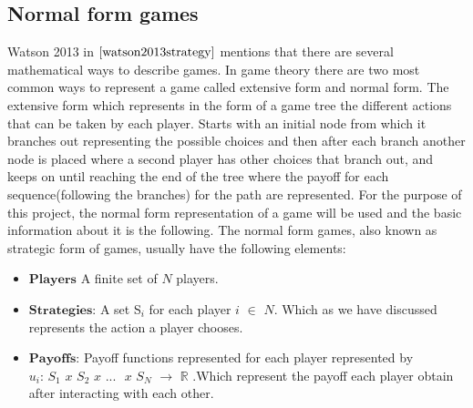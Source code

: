 \subsection{Normal form games}\label{second_section}
Watson 2013 in $\cite{watson2013strategy}$  mentions that there are several mathematical ways to describe games. In game theory there are two most common ways to represent a game called extensive form and normal form. The extensive form which represents in the form of a game tree the different actions that can be taken by each player. Starts with an initial node from which it branches out representing the possible choices and then after each branch another node is placed where a second player has other choices that branch out,  and keeps on until reaching the end of the tree where the payoff for each sequence(following the branches) for the path are represented. For the purpose of this project, the normal form representation of a game will be used and the basic information about it is the following.
The normal form games, also known as strategic form of games, usually have the following elements:
\begin{itemize}
\item $\textbf{Players}$ A finite set of $\textit{N}$ players.
\item $\textbf{Strategies:}$ A set S$_i$ for each player $\textit{i}$ $\in$ $\textit{N}$. Which as we have discussed represents the action a player chooses.
\item $\textbf{Payoffs:}$ Payoff functions represented for each player represented by $\textit{u$_i$: S$_1$ x S$_2$ x}$ ... $\textit{ x S$_N$}$ $\rightarrow$ $\mathbb{R}$ .Which represent the payoff each player obtain after interacting with each other.
\end{itemize}

